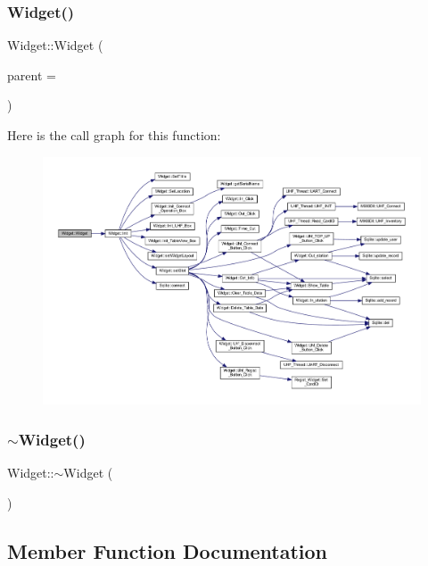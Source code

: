 \subsubsection{\texorpdfstring{Widget()}{Widget()}}
{\footnotesize\ttfamily Widget\+::\+Widget (\begin{DoxyParamCaption}\item[{Q\+Widget $\ast$}]{parent = {} }\end{DoxyParamCaption})}

Here is the call graph for this function\+:
\nopagebreak
\begin{figure}[H]
\begin{center}
\leavevmode
\includegraphics[width=350pt]{class_widget_a29531c7f141e461322981b3b579d4590_cgraph}
\end{center}
\end{figure}
\mbox{\label{class_widget_aa24f66bcbaaec6d458b0980e8c8eae65}} 
\subsubsection{\texorpdfstring{$\sim$Widget()}{~Widget()}}
{\footnotesize\ttfamily Widget\+::$\sim$\+Widget (\begin{DoxyParamCaption}{ }\end{DoxyParamCaption})}



\subsection{Member Function Documentation}
\mbox{\label{class_widget_a6fc213aa66cf58f876e117af46f6aa0a}} 

